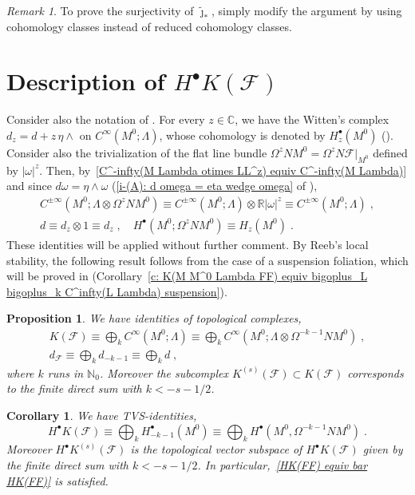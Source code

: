 \documentclass{memo-l}
\theoremstyle{plain}
\newtheorem{cor}[thm]{Corollary}
\newtheorem{prop}[thm]{Proposition}
\theoremstyle{definition}
\theoremstyle{remark}
\newtheorem{rem}[thm]{Remark}
\newcommand{\C}{\mathbb{C}}
\newcommand{\N}{\mathbb{N}}
\newcommand{\R}{\mathbb{R}}
\newcommand{\FF}{\mathcal{F}}
\numberwithin{section}{chapter}
\numberwithin{equation}{section}%
\begin{document}
\begin{rem}\label{r: surjectivity of tilde jmath_*}
To prove the surjectivity of $\tilde\jmath_*$, simply modify the argument by using cohomology classes instead of reduced cohomology classes.
\end{rem}


\section{Description of $H^\bullet K(\FF)$}\label{s: HK(FF)}

Consider also the notation of . For every $z\in\C$, we have the Witten's complex $d_z=d+z\,{\eta\wedge}$ on $C^\infty(M^0;\Lambda)$, whose cohomology is denoted by $H^\bullet_z(M^0)$ (). Consider also the trivialization of the flat line bundle $\Omega^zNM^0=\Omega^zN\FF|_{M^0}$ defined by $|\omega|^z$. Then, by~\eqref{C^-infty(M Lambda otimes LL^z) equiv C^-infty(M Lambda)} and since $d\omega=\eta\wedge\omega$ (\ref{i-(A): d omega = eta wedge omega} of ),
\begin{gather*}
C^{\pm\infty}(M^0;\Lambda\otimes\Omega^zNM^0)\equiv C^{\pm\infty}(M^0;\Lambda)\otimes\R|\omega|^z
\equiv C^{\pm\infty}(M^0;\Lambda)\;,\\
d\equiv d_z\otimes1\equiv d_z\;,\quad H^\bullet(M^0;\Omega^zNM^0)\equiv H_z(M^0)\;.
\end{gather*}
These identities will be applied without further comment. By Reeb's local stability, the following result follows from the case of a suspension foliation, which will be proved in  (Corollary~\ref{c: K(M M^0 Lambda FF) equiv bigoplus_L bigoplus_k C^infty(L Lambda) suspension}).

\begin{prop}\label{p: K(Lambda FF) equiv bigoplus_k C^infty(M^0 Lambda)}
We have identities of topological complexes,
\begin{gather*}
K(\FF)\equiv\bigoplus_kC^\infty(M^0;\Lambda)
\equiv\bigoplus_kC^\infty(M^0;\Lambda\otimes\Omega^{-k-1}NM^0)\;,\\
d_\FF\equiv\bigoplus_kd_{-k-1}\equiv\bigoplus_kd\;,
\end{gather*}
where $k$ runs in $\N_0$. Moreover the subcomplex $K^{(s)}(\FF)\subset K(\FF)$ corresponds to the finite direct sum with $k<-s-1/2$.
\end{prop}

\begin{cor}\label{c: HK(FF) equiv bigoplus_k H_-k-1(M^0)}
We have TVS-identities,
\[
H^\bullet K(\FF)\equiv\bigoplus_kH_{-k-1}^\bullet(M^0)
\equiv\bigoplus_kH^\bullet(M^0,\Omega^{-k-1}NM^0)\;.
\]
Moreover $H^\bullet K^{(s)}(\FF)$ is the topological vector subspace of $H^\bullet K(\FF)$ given by the finite direct sum with $k<-s-1/2$. In particular,~\eqref{HK(FF) equiv bar HK(FF)} is satisfied.
\end{cor}
\end{document}
